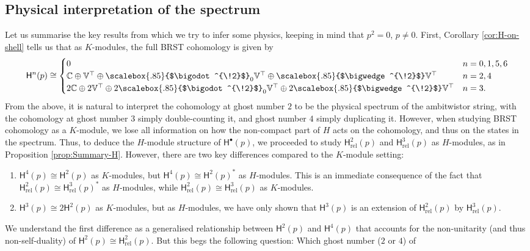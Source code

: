 \documentclass[11pt,reqno,a4paper,final]{amsart}
\newcommand\ext[1]{\scalebox{.85}{$\bigwedge^{\!#1}$}}
\newcommand\sym[1]{\scalebox{.85}{$\bigodot^{\!#1}$}}
\theoremstyle{plain}
\theoremstyle{definition}
\newcommand{\sH}{\mathsf{H}}
\newcommand{\Hrel}{\mathsf{H}_{\mathrm{rel}}}
\newcommand{\VV}{\mathbb{V}}
\newcommand{\CC}{\mathbb{C}}
\newcommand{\1}{\mathbb{1}}
\numberwithin{equation}{section}
\begin{document}
\subsection{Physical interpretation of the spectrum}
\label{sec:phys-interpr-spectr}

Let us summarise the key results from which we try to infer some physics,
keeping in mind that $p^2 = 0$, $p \neq 0$.
First, Corollary \ref{cor:H-on-shell} tells us that as $K$-modules,
the full BRST cohomology is given by
\begin{equation}
  \sH^n(p) \cong
  \begin{cases}
    0 & n = 0,1,5,6\\
    \CC \oplus \VV^\top \oplus \sym{2}_0 \VV^\top \oplus \ext{2} \VV^\top &   n=2,4\\
    2 \CC \oplus 2 \VV^\top \oplus 2 \sym{2}_0 \VV^\top \oplus 2 \ext{2} \VV^\top &   n=3.
  \end{cases}
\end{equation}
From the above, it is natural to interpret the cohomology at ghost
number $2$ to be the physical spectrum of the ambitwistor string, with
the cohomology at ghost number $3$ simply double-counting it, and ghost
number $4$ simply duplicating it. However, when studying BRST cohomology
as a $K$-module, we lose all information on how the non-compact part
of $H$ acts on the cohomology, and thus on the states in the spectrum.
Thus, to deduce the $H$-module structure of $\sH^\bullet(p)$, we
proceeded to study $\Hrel^2(p)$ and $\Hrel^3(p)$ as $H$-modules, as
in Proposition \ref{prop:Summary-H}. However, there are two key
differences compared to the $K$-module setting:
\begin{enumerate}
\item $\sH^4(p) \cong \sH^2(p)$ as $K$-modules, but $\sH^4(p)\cong
  \sH^2(p)^*$ as $H$-modules. This is an immediate consequence of the
  fact that $\Hrel^2(p) \cong \Hrel^3(p)^*$ as $H$-modules, while
  $\Hrel^2(p) \cong \Hrel^3(p)$ as $K$-modules.

\item $\sH^3(p) \cong 2\sH^2(p)$ as $K$-modules, but as $H$-modules,
  we have only shown that $\sH^3(p)$ is an extension of $\Hrel^2(p)$
  by $\Hrel^3(p)$.
\end{enumerate}
We understand the first difference as a generalised relationship
between $\sH^2(p)$ and $\sH^4(p)$ that accounts for the non-unitarity
(and thus non-self-duality) of $\sH^2(p)\cong\Hrel^2(p)$. But this
begs the following question: Which ghost number ($2$ or $4$) of 
\end{document}
